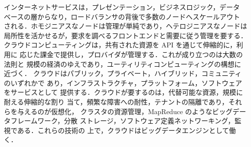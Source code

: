 \documentclass[../main.tex]{subfiles}
\begin{document}
\begin{keypoint}[章のまとめ]
  インターネットサービスは，プレゼンテーション，ビジネスロジック，データ
  ベースの層からなり，ロードバランサの背後で多数のノードへスケールアウト
  される．ホモジニアスなノードは管理が単純であり，ヘテロジニアスなノードは
  局所性を活かせるが，要求を調べるフロントエンドと需要に従う管理を要する．
  クラウドコンピューティングは，共有された資源を API を通じて伸縮的に，利用に
  応じた課金で提供し，プロバイダが管理する．これが成り立つのは大数の法則と
  規模の経済のゆえであり，ユーティリティコンピューティングの構想に近づく．
  クラウドはパブリック，プライベート，ハイブリッド，コミュニティのいずれかで
  あり，インフラストラクチャ，プラットフォーム，ソフトウェアをサービスとして
  提供する．クラウドが要するのは，代替可能な資源，規模に耐える伸縮的な割り
  当て，頻繁な障害への耐性，テナントの隔離であり，それらを与えるのが仮想化，
  クラスタの資源管理，MapReduce のようなビッグデータフレームワーク，分散
  ストレージ，ソフトウェア定義ネットワーキング，監視である．これらの技術の
  上で，クラウドはビッグデータエンジンとして働く．
\end{keypoint}
\end{document}
